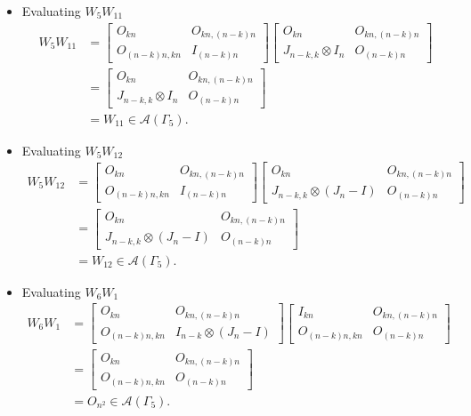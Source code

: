 \begin{itemize}
\item Evaluating $W_{5}W_{11}$
\begin{align*}
    W_5W_{11}
    &= \begin{bmatrix}
        O_{kn} & O_{kn, (n-k)n} \\
        O_{(n-k)n,kn} & I_{(n - k)n}
    \end{bmatrix}
    \begin{bmatrix}
        O_{kn} & O_{kn, (n-k)n} \\
        J_{n-k,k}\otimes I_n & O_{(n - k)n}
    \end{bmatrix}\\
    &= \begin{bmatrix}
        O_{kn} & O_{kn, (n-k)n} \\
        J_{n-k,k}\otimes I_n & O_{(n - k)n}
    \end{bmatrix}\\
    &= W_{11} \in\mathcal{A}(\Gamma_5).
\end{align*}

\item Evaluating $W_{5}W_{12}$
\begin{align*}
    W_5W_{12}
    &= \begin{bmatrix}
        O_{kn} & O_{kn, (n-k)n} \\
        O_{(n-k)n,kn} & I_{(n - k)n}
    \end{bmatrix}
    \begin{bmatrix}
        O_{kn} & O_{kn, (n-k)n} \\
        J_{n-k,k}\otimes (J_n-I) & O_{(n - k)n}
    \end{bmatrix}\\
    &= \begin{bmatrix}
        O_{kn} & O_{kn, (n-k)n} \\
        J_{n-k,k}\otimes (J_n-I) & O_{(n - k)n}
    \end{bmatrix}\\
    &= W_{12} \in\mathcal{A}(\Gamma_5).
\end{align*}

\item Evaluating $W_{6}W_{1}$
\begin{align*}
    W_6W_1
    &= \begin{bmatrix}
        O_{kn} & O_{kn, (n-k)n} \\
        O_{(n-k)n,kn} & I_{n - k} \otimes (J_n - I)
    \end{bmatrix}
    \begin{bmatrix}
        I_{kn} & O_{kn, (n-k)n} \\
        O_{(n-k)n,kn} & O_{(n - k)n}
    \end{bmatrix}\\
    &= \begin{bmatrix}
        O_{kn} & O_{kn, (n-k)n} \\
        O_{(n-k)n,kn} & O_{(n - k)n}
    \end{bmatrix}\\
    &= O_{n^2} \in\mathcal{A}(\Gamma_5).
\end{align*}


\end{itemize}
